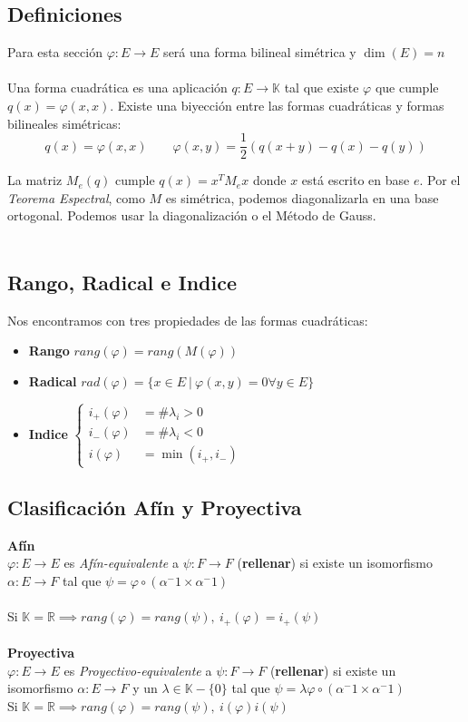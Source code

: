 \documentclass[leqno]{article}
\renewcommand{\phi}{\varphi}
\begin{document}
\subsection{Definiciones}
Para esta sección $\varphi:E\to E$ será una forma bilineal simétrica y $\dim(E)=n$ \\
\\
Una forma cuadrática es una aplicación $q:E\to \mathbb{K}$ tal que existe $\varphi$ que cumple $q(x)=\phi(x,x)$. Existe una biyección entre las formas cuadráticas y formas bilineales simétricas:
$$
q(x) = \phi(x,x) \qquad \varphi(x,y)=\frac{1}{2}(q(x+y)-q(x) - q(y))
$$



La matriz $M_e(q)$ cumple $q(x)= x^TM_ex$ donde $x$ está escrito en base $e$. Por el \textit{Teorema Espectral}, como $M$ es simétrica, podemos diagonalizarla en una base ortogonal. Podemos usar la diagonalización o el Método de Gauss. \\
\\
\subsection{Rango, Radical e Indice}
Nos encontramos con tres propiedades de las formas cuadráticas:
\begin{itemize}
    \item \textbf{Rango} $rang(\phi) = rang(M(\phi))$
    \item \textbf{Radical} $rad(\phi)=\{x\in E \ | \ \phi(x,y)=0 \forall y\in E\}$
    \item \textbf{Indice} $\begin{cases} 
    i_+(\phi) &= \# \lambda_i>0 \\
    i_-(\phi) &= \# \lambda_i<0 \\
    i(\phi) &= \min(i_+, i_-)
    \end{cases}$
\end{itemize}

\subsection{Clasificación Afín y Proyectiva}
\textbf{Afín}\\
$\phi:E\to E$ es \textit{Afín-equivalente} a $\psi:F\to F$ (\textbf{rellenar}) si existe un isomorfismo $\alpha:E\to F$ tal que $\psi = \phi\circ(\alpha^-1\times \alpha^-1)$ \\
\\
Si $\mathbb{K} = \mathbb{R} \implies rang(\phi) = rang(\psi), \ i_+(\phi) = i_+(\psi)$ \\
\\
\textbf{Proyectiva}\\
$\phi:E\to E$ es \textit{Proyectivo-equivalente} a $\psi:F\to F$ (\textbf{rellenar}) si existe un isomorfismo $\alpha:E\to F$ y un $\lambda\in \mathbb{K}-\{0\}$ tal que $\psi = \lambda\phi\circ(\alpha^-1\times \alpha^-1)$ \\
Si $\mathbb{K} = \mathbb{R} \implies rang(\phi) = rang(\psi), \ i(\phi)  i(\psi)$
\end{document}
